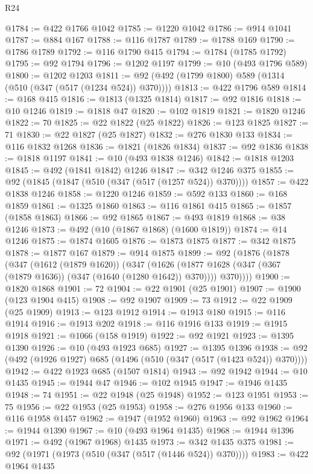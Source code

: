 \begin{lexlean}{R24}
\begin{coremodule}
@1784 := @422 @1766 @1042
@1785 := @1220 @1042
@1786 := @914 @1041
@1787 := @884 @167
@1788 := @116 @1787
@1789 := @1788 @169
@1790 := @1786 @1789
@1792 := @116 @1790 @415
@1794 := @1784 (@1785 @1792)
@1795 := @92 @1794
@1796 := @1202 @1197
@1799 := @10 (@493 @1796 @589)
@1800 := @1202 @1203
@1811 := @92 (@492 (@1799 @1800) @589 (@1314 (@510 (@347 (@517 (@1234 @524)) @370))))
@1813 := @422 @1796 @589
@1814 := @168 @415
@1816 := @1813 (@1325 @1814)
@1817 := @92 @1816
@1818 := @10 @1246
@1819 := @1818 @47
@1820 := @102 @1819
@1821 := @1820 @1246
@1822 := 70
@1825 := @22 @1822 (@25 @1822)
@1826 := @123 @1825
@1827 := 71
@1830 := @22 @1827 (@25 @1827)
@1832 := @276 @1830 @133
@1834 := @116 @1832 @1268
@1836 := @1821 (@1826 @1834)
@1837 := @92 @1836
@1838 := @1818 @1197
@1841 := @10 (@493 @1838 @1246)
@1842 := @1818 @1203
@1845 := @492 (@1841 @1842) @1246
@1847 := @342 @1246 @375
@1855 := @92 (@1845 (@1847 (@510 (@347 (@517 (@1257 @524)) @370))))
@1857 := @422 @1838 @1246
@1858 := @1220 @1246
@1859 := @592 @133
@1860 := @168 @1859
@1861 := @1325 @1860
@1863 := @116 @1861 @415
@1865 := @1857 (@1858 @1863)
@1866 := @92 @1865
@1867 := @493 @1819
@1868 := @38 @1246
@1873 := @492 (@10 (@1867 @1868) (@1600 @1819))
@1874 := @14 @1246
@1875 := @1874 @1605
@1876 := @1873 @1875
@1877 := @342 @1875
@1878 := @1877 @167
@1879 := @914 @1875
@1899 := @92
    (@1876
      (@1878
        (@347
          (@1612 (@1879 @1620))
          (@347
            (@1626 (@1877 @1628 (@347 (@367 (@1879 @1636)) (@347 (@1640 (@1280 @1642)) @370))))
            @370))))
@1900 := @1820 @1868
@1901 := 72
@1904 := @22 @1901 (@25 @1901)
@1907 := @1900 (@123 @1904 @415)
@1908 := @92 @1907
@1909 := 73
@1912 := @22 @1909 (@25 @1909)
@1913 := @123 @1912
@1914 := @1913 @180
@1915 := @116 @1914
@1916 := @1913 @202
@1918 := @116 @1916 @133
@1919 := @1915 @1918
@1921 := @1066 (@158 @1919)
@1922 := @92 @1921
@1923 := @1395 @1390
@1926 := @10 (@493 @1923 @685)
@1927 := @1395 @1396
@1938 := @92 (@492 (@1926 @1927) @685 (@1496 (@510 (@347 (@517 (@1423 @524)) @370))))
@1942 := @422 @1923 @685 (@1507 @1814)
@1943 := @92 @1942
@1944 := @10 @1435
@1945 := @1944 @47
@1946 := @102 @1945
@1947 := @1946 @1435
@1948 := 74
@1951 := @22 @1948 (@25 @1948)
@1952 := @123 @1951
@1953 := 75
@1956 := @22 @1953 (@25 @1953)
@1958 := @276 @1956 @133
@1960 := @116 @1958 @1457
@1962 := @1947 (@1952 @1960)
@1963 := @92 @1962
@1964 := @1944 @1390
@1967 := @10 (@493 @1964 @1435)
@1968 := @1944 @1396
@1971 := @492 (@1967 @1968) @1435
@1973 := @342 @1435 @375
@1981 := @92 (@1971 (@1973 (@510 (@347 (@517 (@1446 @524)) @370))))
@1983 := @422 @1964 @1435

\end{coremodule}
\end{lexlean}
